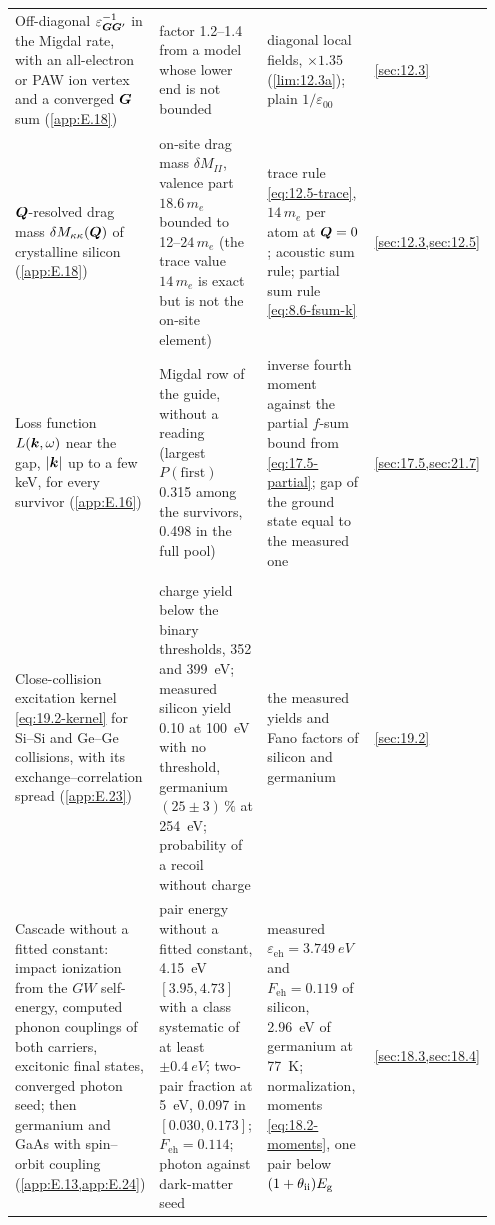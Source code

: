 {\begin{longtable}{@{}>{\raggedright\arraybackslash}p{0.25\linewidth}>{\raggedright\arraybackslash}p{0.305\linewidth}>{\raggedright\arraybackslash}p{0.305\linewidth}>{\raggedright\arraybackslash}p{0.09\linewidth}@{}}
  Off-diagonal $\varepsilon^{-1}_{\bm{G}\bm{G}'}$ in the Migdal rate, with an all-electron or PAW ion vertex and a converged $\bm{G}$ sum (\cref{app:E.18}) & factor 1.2--1.4 from a model whose lower end is not bounded & diagonal local fields, $\times1.35$ (\cref{lim:12.3a}); plain $1/\varepsilon_{00}$ & \cref{sec:12.3} \\
  $\bm{Q}$-resolved drag mass $\delta M_{\kappa\kappa}(\bm{Q})$ of crystalline silicon (\cref{app:E.18}) & on-site drag mass $\delta M_{II}$, valence part $18.6\,m_e$ bounded to 12--$24\,m_e$ (the trace value $14\,m_e$ is exact but is not the on-site element) & trace rule \cref{eq:12.5-trace}, $14\,m_e$ per atom at $\bm{Q} = 0$; acoustic sum rule; partial sum rule \cref{eq:8.6-fsum-k} & \cref{sec:12.3,sec:12.5} \\
  Loss function $L(\bm{k},\omega)$ near the gap, $|\bm{k}|$ up to a few keV, for every survivor (\cref{app:E.16}) & Migdal row of the guide, without a reading (largest $P(\mathrm{first})$ 0.315 among the survivors, 0.498 in the full pool) & inverse fourth moment against the partial $f$-sum bound from \cref{eq:17.5-partial}; gap of the ground state equal to the measured one & \cref{sec:17.5,sec:21.7} \\
  \midrule
  \multicolumn{4}{@{}l}{\emph{Charge of a nuclear recoil and the cascade}} \\
  Close-collision excitation kernel \cref{eq:19.2-kernel} for Si--Si and Ge--Ge collisions, with its exchange--correlation spread (\cref{app:E.23}) & charge yield below the binary thresholds, 352 and \SI{399}{eV}; measured silicon yield 0.10 at \SI{100}{eV} with no threshold, germanium $(25 \pm 3)\,\%$ at \SI{254}{eV}; probability of a recoil without charge & the measured yields and Fano factors of silicon and germanium & \cref{sec:19.2} \\
  Cascade without a fitted constant: impact ionization from the $GW$ self-energy, computed phonon couplings of both carriers, excitonic final states, converged photon seed; then germanium and GaAs with spin--orbit coupling (\cref{app:E.13,app:E.24}) & pair energy without a fitted constant, \SI{4.15}{eV} $[3.95, 4.73]$ with a class systematic of at least $\pm\SI{0.4}{eV}$; two-pair fraction at \SI{5}{eV}, 0.097 in $[0.030, 0.173]$; $F_{\mathrm{eh}} = 0.114$; photon against dark-matter seed & measured $\varepsilon_{\mathrm{eh}} = \SI{3.749}{eV}$ and $F_{\mathrm{eh}} = 0.119$ of silicon, \SI{2.96}{eV} of germanium at \SI{77}{K}; normalization, moments \cref{eq:18.2-moments}, one pair below $(1 + \theta_{\mathrm{ii}})E_{\mathrm{g}}$ & \cref{sec:18.3,sec:18.4} \\

\end{longtable}}
